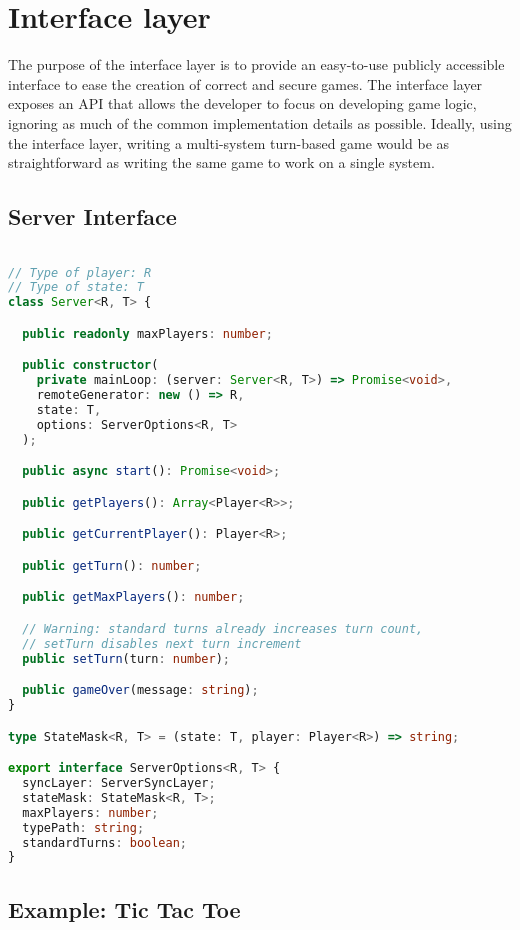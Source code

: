 \documentclass{article}
\begin{document}
\section{Interface layer}

The purpose of the interface layer is to provide an easy-to-use publicly accessible interface to ease the creation of correct and secure games. The interface layer exposes an API that allows the developer to focus on developing game logic, ignoring as much of the common implementation details as possible. Ideally, using the interface layer, writing a multi-system turn-based game would be as straightforward as writing the same game to work on a single system.

\subsection*{Server Interface}

\begin{lstlisting}[language=Typescript]

// Type of player: R
// Type of state: T
class Server<R, T> {

  public readonly maxPlayers: number;

  public constructor(
    private mainLoop: (server: Server<R, T>) => Promise<void>,
    remoteGenerator: new () => R,
    state: T,
    options: ServerOptions<R, T>
  );

  public async start(): Promise<void>;

  public getPlayers(): Array<Player<R>>;

  public getCurrentPlayer(): Player<R>;

  public getTurn(): number;

  public getMaxPlayers(): number;

  // Warning: standard turns already increases turn count,
  // setTurn disables next turn increment
  public setTurn(turn: number);

  public gameOver(message: string);
}

type StateMask<R, T> = (state: T, player: Player<R>) => string;

export interface ServerOptions<R, T> {
  syncLayer: ServerSyncLayer;
  stateMask: StateMask<R, T>;
  maxPlayers: number;
  typePath: string;
  standardTurns: boolean;
}

\end{lstlisting}

\subsection*{Example: Tic Tac Toe}
\end{document}
